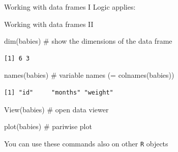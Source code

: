 \documentclass[
  ignorenonframetext,
]{beamer}
\newenvironment{Shaded}{\begin{snugshade}}{\end{snugshade}}
\newcommand{\CommentTok}[1]{\textcolor[rgb]{0.54,0.53,0.53}{#1}}
\newcommand{\DecValTok}[1]{\textcolor[rgb]{0.69,0.50,0.00}{#1}}
\newcommand{\FunctionTok}[1]{\textcolor[rgb]{0.39,0.29,0.61}{#1}}
\newcommand{\NormalTok}[1]{\textcolor[rgb]{0.12,0.11,0.11}{#1}}
\newcommand{\SpecialCharTok}[1]{\textcolor[rgb]{0.24,0.68,0.91}{#1}}
\newcommand{\StringTok}[1]{\textcolor[rgb]{0.75,0.01,0.01}{#1}}
\begin{document}
\begin{frame}[fragile]{Working with data frames I}
\protect\hypertarget{working-with-data-frames-i}{}
Logic applies:

\begin{Shaded}
\end{Shaded}
\end{frame}

\begin{frame}[fragile]{Working with data frames II}
\protect\hypertarget{working-with-data-frames-ii}{}
\begin{Shaded}
\begin{Highlighting}[]
\FunctionTok{dim}\NormalTok{(babies) }\CommentTok{\# show the dimensions of the data frame}
\end{Highlighting}
\end{Shaded}

\begin{verbatim}
[1] 6 3
\end{verbatim}

\begin{Shaded}
\begin{Highlighting}[]
\FunctionTok{names}\NormalTok{(babies) }\CommentTok{\# variable names (= colnames(babies))}
\end{Highlighting}
\end{Shaded}

\begin{verbatim}
[1] "id"     "months" "weight"
\end{verbatim}

\begin{Shaded}
\begin{Highlighting}[]
\FunctionTok{View}\NormalTok{(babies) }\CommentTok{\# open data viewer}

\FunctionTok{plot}\NormalTok{(babies) }\CommentTok{\# pariwise plot}
\end{Highlighting}
\end{Shaded}

\vfill

\footnotesize You can use these commands also on other \texttt{R}
objects
\end{frame}
\end{document}
